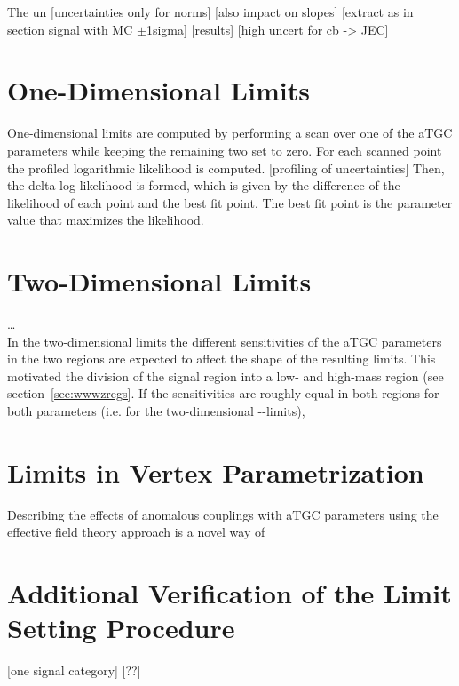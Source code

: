 \noindent The un
[uncertainties only for norms]
[also impact on slopes]
[extract as in section signal with MC $\pm$1sigma]
[results]
[high uncert for cb -> JEC]


\section{One-Dimensional Limits}
One-dimensional limits are computed by performing a scan over one of the aTGC parameters while keeping the remaining two set to zero. For each scanned point the profiled logarithmic likelihood is computed.
[profiling of uncertainties]
Then, the delta-log-likelihood is formed, which is given by the difference of the likelihood of each point and the best fit point. The best fit point is the parameter value that maximizes the likelihood. 


\section{Two-Dimensional Limits}
\label{sec:2dlims}
\dots \\
\noindent In the two-dimensional limits the different sensitivities of the aTGC parameters in the two regions are expected to affect the shape of the resulting limits. This motivated the division of the signal region into a low- and high-mass region (see section~\ref{sec:wwwzregs}. If the sensitivities are roughly equal in both regions for both parameters (i.e. for the two-dimensional \Tcwww -\Tccw -limits), 


\section{Limits in Vertex Parametrization}
\label{sec:vertex}
Describing the effects of anomalous couplings with aTGC parameters using the effective field theory approach is a novel way of 


\section{Additional Verification of the Limit Setting Procedure}
[one signal category]
[??]
